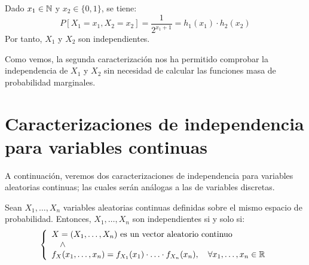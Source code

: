 \begin{ejemplo}
\begin{description}
        Dado $x_1\in \mathbb{N}$ y $x_2\in \{0,1\}$, se tiene:
        \begin{equation*}
            P[X_1=x_1,X_2=x_2]=\dfrac{1}{2^{x_1+1}}=h_1(x_1)\cdot h_2(x_2)
        \end{equation*}
        Por tanto, $X_1$ y $X_2$ son independientes.
    \end{description}

    Como vemos, la segunda caracterización nos ha permitido comprobar la independencia de $X_1$ y $X_2$ sin necesidad de calcular las funciones masa de probabilidad marginales. 
\end{ejemplo}


\section{Caracterizaciones de independencia para variables continuas}

A continuación, veremos dos caracterizaciones de independencia para variables aleatorias continuas; las cuales serán análogas a las de variables discretas.
\begin{prop}
    Sean $X_1, \ldots, X_n$ variables aleatorias continuas definidas sobre el mismo espacio de probabilidad. Entonces, $X_1, \ldots, X_n$ son independientes si y solo si:
    \[
        \left\{
            \begin{array}{l}
                X=(X_1, \ldots, X_n) \text{ es un vector aleatorio continuo} \\
                \quad \land \\
                f_X(x_1, \ldots, x_n) = f_{X_1}(x_1) \cdot \ldots \cdot f_{X_n}(x_n), \quad \forall x_1, \ldots, x_n \in \mathbb{R}
            \end{array}
        \right.
    \]
\end{prop}

